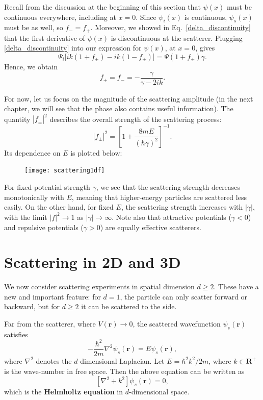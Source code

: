\documentclass[pra,12pt]{revtex4}
\begin{document}
Recall from the discussion at the beginning of this section that
$\psi(x)$ must be continuous everywhere, including at $x = 0$.  Since
$\psi_i(x)$ is continuous, $\psi_s(x)$ must be as well, so $f_- =
f_+$.  Moreover, we showed in Eq.~\eqref{delta_discontinuity} that the
first derivative of $\psi(x)$ is discontinuous at the scatterer.
Plugging \eqref{delta_discontinuity} into our expression for
$\psi(x)$, at $x = 0$, gives
\begin{equation}
  \Psi_i\big[ik(1+f_\pm) - ik(1-f_\pm)\big] =  \Psi(1+f_\pm) \gamma.
\end{equation}
Hence, we obtain
\begin{equation}
  f_+ = f_- = -\frac{\gamma}{\gamma - 2ik}.
\end{equation}

For now, let us focus on the magnitude of the scattering amplitude (in
the next chapter, we will see that the phase also contains useful
information).  The quantity $|f_\pm|^2$ describes the overall strength
of the scattering process:
\begin{equation}
  |f_\pm|^2 = \left[1 + \frac{8mE}{(\hbar\gamma)^2}\right]^{-1}.
\end{equation}
Its dependence on $E$ is plotted below:

\begin{figure}[h]
  \centering\texttt{[image: scattering1df]}
\end{figure}

\noindent
For fixed potential strength $\gamma$, we see that the scattering
strength decreases monotonically with $E$, meaning that higher-energy
particles are scattered less easily.  On the other hand, for fixed
$E$, the scattering strength increases with $|\gamma|$, with the limit
$|f|^2 \rightarrow 1$ as $|\gamma|\rightarrow \infty$.  Note also that
attractive potentials ($\gamma < 0$) and repulsive potentials ($\gamma
> 0$) are equally effective scatterers.

\section{Scattering in 2D and 3D}
\label{sec:2d3d_scattering}

We now consider scattering experiments in spatial dimension $d \ge 2$.
These have a new and important feature: for $d = 1$, the particle can
only scatter forward or backward, but for $d \ge 2$ it can be
scattered to the side.

Far from the scatterer, where $V(\mathbf{r})\rightarrow 0$, the
scattered wavefunction $\psi_s(\mathbf{r})$ satisfies
\begin{equation}
  -\frac{\hbar^2}{2m} \nabla^2 \psi_s(\mathbf{r}) = E \psi_s(\mathbf{r}),
\end{equation}
where $\nabla^2$ denotes the $d$-dimensional Laplacian.  Let $E =
\hbar^2 k^2 / 2m$, where $k \in \mathbf{R}^+$ is the wave-number in
free space.  Then the above equation can be written as
\begin{equation}
  \left[\nabla^2 + k^2\right] \psi_s(\mathbf{r}) = 0,
  \label{helmholtzeq}
\end{equation}
which is the \textbf{Helmholtz equation} in $d$-dimensional space.
\end{document}
